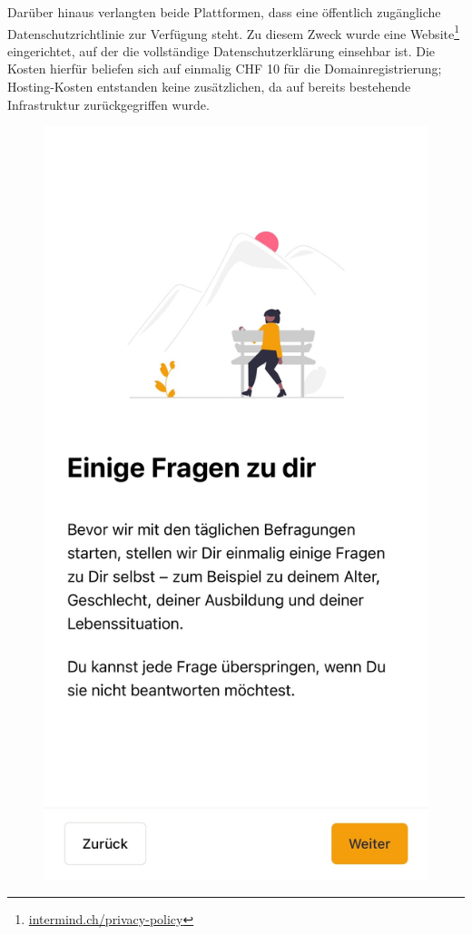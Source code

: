 Darüber hinaus verlangten beide Plattformen, dass eine öffentlich zugängliche Datenschutzrichtlinie zur Verfügung steht. Zu diesem Zweck wurde eine Website\footnote{\href{https://intermind.ch/privacy-policy.html?lang=de}{intermind.ch/privacy-policy}} eingerichtet, auf der die vollständige Datenschutzerklärung einsehbar ist. Die Kosten hierfür beliefen sich auf einmalig CHF 10 für die Domainregistrierung; Hosting-Kosten entstanden keine zusätzlichen, da auf bereits bestehende Infrastruktur zurückgegriffen wurde.

\begin{figure}[h]
    \centering
    \begin{minipage}[t]{0.38\textwidth}
        \centering
        \includegraphics[width=\textwidth]{Arbeit/images/printscreens/fragen_zu_dir.jpeg}

\end{minipage}
\end{figure}
